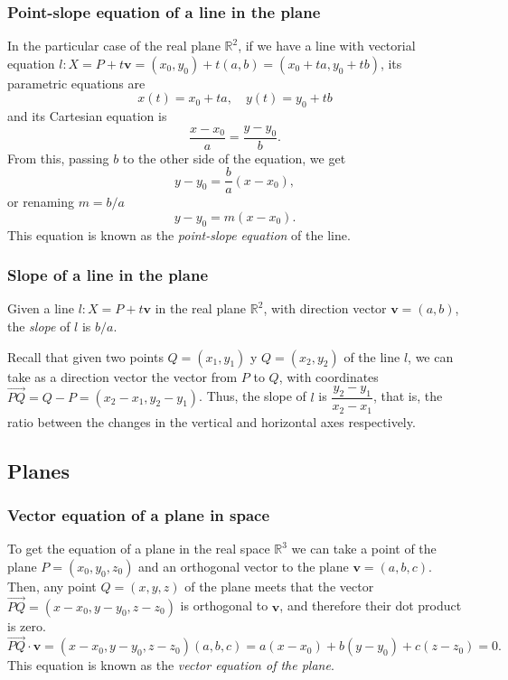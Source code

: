 \begin{frame}
\frametitle{Point-slope equation of a line in the plane}
In the particular case of the real plane $\mathbb{R}^2$, if we have a line with vectorial equation $l: X=P+t\mathbf{v}=(x_0,y_0)+t(a,b)
= (x_0+ta,y_0+tb)$, its parametric equations are
\[
x(t)=x_0+ta,\quad y(t)=y_0+tb
\]
and its Cartesian equation is
\[
\frac{x-x_0}{a} = \frac{y-y_0}{b}.
\]
From this, passing $b$ to the other side of the equation, we get 
\[
y-y_0 = \frac{b}{a}(x-x_0),
\]
or renaming $m=b/a$
\[
y-y_0=m(x-x_0).
\]
This equation is known as the \emph{point-slope equation} of the line.
\end{frame}


\begin{frame}
\frametitle{Slope of a line in the plane}
\begin{definition}
Given a line $l: X=P+t\mathbf{v}$ in the real plane $\mathbb{R}^2$, with direction vector $\mathbf{v}=(a,b)$, the \emph{slope} of $l$ is $b/a$.
\end{definition}

Recall that given two points $Q=(x_1,y_1)$ y $Q=(x_2,y_2)$ of the line $l$, we can take as a direction vector the vector from $P$ to $Q$, with coordinates $\vec{PQ}=Q-P=(x_2-x_1,y_2-y_1)$. 
Thus, the slope of $l$ is $\dfrac{y_2-y_1}{x_2-x_1}$, that is, the ratio between the changes in the vertical and horizontal axes respectively.
\begin{center}

\end{center}
\end{frame}



\subsection{Planes}
\begin{frame}
\frametitle{Vector equation of a plane in space}
To get the equation of a plane in the real space $\mathbb{R}^3$ we can take a point of the plane $P=(x_0,y_0,z_0)$ and an orthogonal vector to the plane $\mathbf{v}=(a,b,c)$.
Then, any point $Q=(x,y,z)$ of the plane meets that the vector $\vec{PQ} = (x-x_0,y-y_0,z-z_0)$ is orthogonal to $\mathbf{v}$, and therefore their dot product is zero. 
\[
\vec{PQ}\cdot\mathbf{v} = (x-x_0,y-y_0,z-z_0)(a,b,c) = a(x-x_0)+b(y-y_0)+c(z-z_0) = 0.
\]
This equation is known as the \emph{vector equation of the plane}.

\begin{center}

\end{center}
\end{frame}


